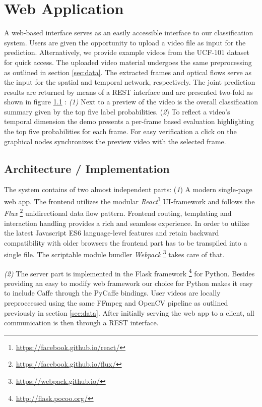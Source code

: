 \section{Web Application}
\label{sec:web}

A web-based interface serves as an easily accessible interface to our classification system.
Users are given the opportunity to upload a video file as input for the prediction.
Alternatively, we provide example videos from the UCF-101 dataset for quick access.
The uploaded video material undergoes the same preprocessing as outlined in section \ref{sec:data}.
The extracted frames and optical flows serve as the input for the spatial and temporal network, respectively.
The joint prediction results are returned by means of a REST interface and are presented two-fold as shown in figure \ref{} :
\textit{(1)} Next to a preview of the video is the overall classification summary given by the top five label probabilities.
(\textit{2}) To reflect a video’s temporal dimension the demo presents a per-frame based evaluation highlighting the top five probabilities for each frame.
For easy verification a click on the graphical nodes synchronizes the preview video with the selected frame.

\subsection{Architecture / Implementation}
The system contains of two almost independent parts:
(\textit{1}) A modern single-page web app.
The frontend utilizes the modular \textit{React}\footnote{\url{https://facebook.github.io/react/}} UI-framework and follows the \textit{Flux} \footnote{\url{https://facebook.github.io/flux/}} unidirectional data flow pattern.
Frontend routing, templating and interaction handling provides a rich and seamless experience.
In order to utilize the latest Javascript ES6 language-level features and retain backward compatibility with older browsers the frontend part has to be transpiled into a single file.
The scriptable module bundler \textit{Webpack} \footnote{\url{https://webpack.github.io/}} takes care of that.

\textit{(2)} The server part is implemented in the Flask framework \footnote{\url{http://flask.pocoo.org/}} for Python.
Besides providing an easy to modify web framework our choice for Python makes it easy to include Caffe through the PyCaffe bindings.
User videos are locally preproccessed using the same FFmpeg and OpenCV pipeline as outlined previously in section \ref{sec:data}.
After initially serving the web app to a client, all communication is then through a REST interface.

